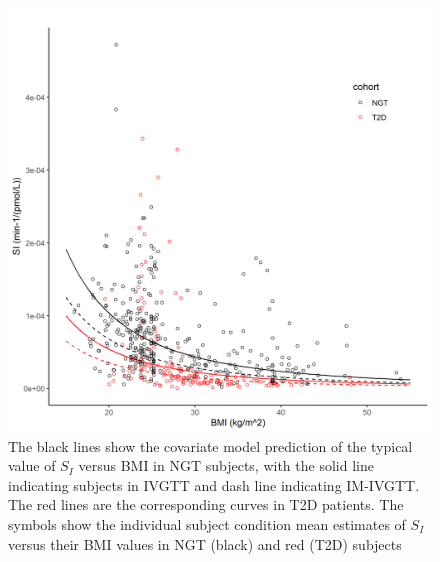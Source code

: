 \documentclass[utf8]{frontiersSCNS} %
\begin{document}
\begin{figure}[h!]
\begin{center}
\includegraphics[width=15cm]{SI_BMI.PNG}
\end{center}
\caption{The black lines show the covariate model prediction of the typical value of $S_I$ versus BMI in NGT subjects, with the solid line indicating subjects in IVGTT and dash line indicating IM-IVGTT. The red lines are the corresponding curves in T2D patients. The symbols show the individual subject condition mean estimates of $S_I$ versus their BMI values in NGT (black) and red (T2D) subjects}
\label{fig: SI_BMI}
\end{figure}

\end{document}
